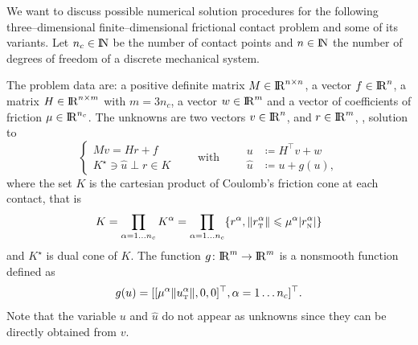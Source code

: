 We want to discuss possible numerical solution procedures for the following three--dimensional finite--dimensional frictional contact problem and some of its variants.  Let $n_c\in \mathrm{I\!N}$ be the number of contact points and $n\in\mathrm{I\!N}$ the number of degrees of freedom of a discrete mechanical system.

The problem data are: a positive definite matrix ${M} \in \mathrm{I\!R}^{n \times n}$, a vector $ {f} \in \mathrm{I\!R}^n$, a matrix  ${H} \in \mathrm{I\!R}^{n \times m}$ with $m= 3n_c$, a vector $w \in \mathrm{I\!R}^{m}$ and a vector of coefficients of friction $\mu \in \mathrm{I\!R}^{n_c}$.
The unknowns are two vectors $ {v} \in \mathrm{I\!R}^n$,  and $r\in \mathrm{I\!R}^m$, , solution to
\begin{equation}\label{eq:soccp1-intro}
 \begin{cases}
  M v = {H} {r} + {f}\\
  K^\star \ni {\hat u} \perp r \in K
 \end{cases}\qquad\text{with}\qquad
 \begin{aligned}
    u &\coloneqq H^\top v + w\\
    \hat u &\coloneqq u + g(u),
   \end{aligned}
\end{equation}
where the set $K$ is the cartesian product of Coulomb's friction cone at each contact, that is
\begin{equation}
  \label{eq:CC}
  K = \prod_{\alpha=1\ldots n_c} K^{\alpha}  = \prod_{\alpha=1\ldots n_c} \{r^\alpha, \|r^\alpha_\t \| \leq \mu^\alpha |r^\alpha_\n| \}
\end{equation}
and $K^\star$ is dual cone of $K$. The function $g\colon\mathrm{I\!R}^m\to\mathrm{I\!R}^m$ is a nonsmooth function defined as
\begin{equation}
g(u) = [[\mu^\alpha  \|u^\alpha_\t\|, 0, 0]^\top, \alpha = 1\ldots n_c]^\top\label{eq:gg}. 
\end{equation} Note that the variable $u$ and $\hat u$  do not appear as unknowns since they can be directly obtained from $v$.

